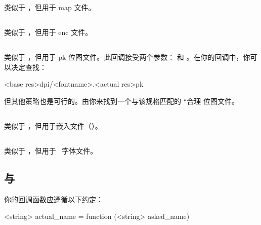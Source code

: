 
类似于 ，但用于 map 文件。

\subsection{}


类似于 ，但用于 enc 文件。

\subsection{}


类似于 ，但用于 pk 位图文件。此回调接受两个参数：
 和 。在你的回调中，你可以决定查找：

\begin{typing}
<base res>dpi/<fontname>.<actual res>pk
\end{typing}

但其他策略也是可行的。由你来找到一个与该规格匹配的 ``合理
位图文件。

\subsection{}


类似于 ，但用于嵌入文件（）。

\subsection{}


类似于 ，但用于 \OPENTYPE\ 字体文件。

\subsection{ 与 }


你的回调函数应遵循以下约定：

\begin{typing}
<string> actual_name =
    function (<string> asked_name)
\end{typing}

